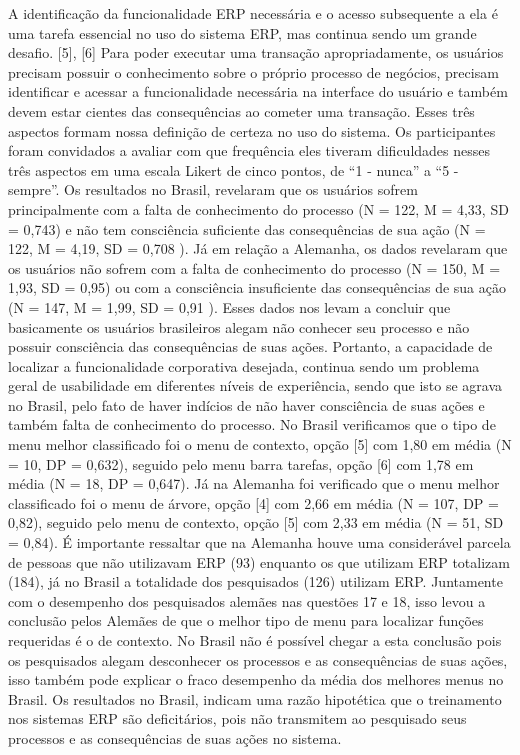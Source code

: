A identificação da funcionalidade ERP necessária e o acesso subsequente a ela é uma tarefa essencial no uso do sistema ERP, mas continua sendo um grande desafio. [5], [6] Para poder executar uma transação apropriadamente, os usuários precisam possuir o conhecimento sobre o próprio processo de negócios, precisam identificar e acessar a funcionalidade necessária na interface do usuário e também devem estar cientes das consequências ao cometer uma transação. Esses três aspectos formam nossa definição de certeza no uso do sistema. Os participantes foram convidados a avaliar com que frequência eles tiveram dificuldades nesses três aspectos em uma escala Likert de cinco pontos, de “1 - nunca” a “5 - sempre”.\newline
\indent Os resultados no Brasil, revelaram que os usuários sofrem principalmente com a falta de conhecimento do processo (N = 122, M = 4,33, SD = 0,743) e não tem consciência suficiente das consequências de sua ação (N = 122, M = 4,19, SD = 0,708 ). Já em relação a Alemanha, os dados revelaram que os usuários não sofrem com a falta de conhecimento do processo (N = 150, M = 1,93, SD = 0,95) ou com a consciência insuficiente das consequências de sua ação (N = 147, M = 1,99, SD = 0,91 ). Esses dados nos levam a concluir que  basicamente os  usuários brasileiros alegam não conhecer seu processo e não possuir consciência das consequências de suas ações.\newline
\indent Portanto, a capacidade de localizar a funcionalidade corporativa desejada, continua sendo um problema geral de usabilidade em diferentes níveis de experiência, sendo que isto se agrava no Brasil, pelo fato de haver indícios de não haver consciência de suas ações e também falta de conhecimento do processo.\newline
\indent No Brasil verificamos que o tipo de menu melhor classificado foi o menu de contexto, opção [5] com 1,80 em média (N = 10, DP = 0,632), seguido pelo menu barra tarefas, opção [6] com 1,78 em média (N = 18, DP = 0,647). Já na Alemanha foi verificado que o menu melhor classificado foi o menu de árvore, opção [4] com 2,66 em média (N = 107, DP = 0,82), seguido pelo menu de contexto, opção [5] com 2,33 em média (N = 51, SD = 0,84). É importante ressaltar que na Alemanha houve uma considerável parcela de pessoas que não utilizavam ERP (93) enquanto os que utilizam ERP totalizam (184), já no Brasil a totalidade dos pesquisados (126) utilizam ERP.\newline
\indent Juntamente com o desempenho dos pesquisados alemães nas questões 17 e 18, isso levou a conclusão pelos Alemães de que o melhor tipo de menu para localizar funções requeridas é o de contexto.  No Brasil não é possível chegar a esta conclusão pois os pesquisados alegam desconhecer os processos e as consequências de suas ações, isso também pode explicar o fraco desempenho da média dos melhores menus no Brasil.\newline
\indent Os resultados no Brasil, indicam uma razão hipotética que o treinamento nos sistemas ERP são deficitários, pois não transmitem ao pesquisado seus processos e as consequências de suas ações no sistema.  

